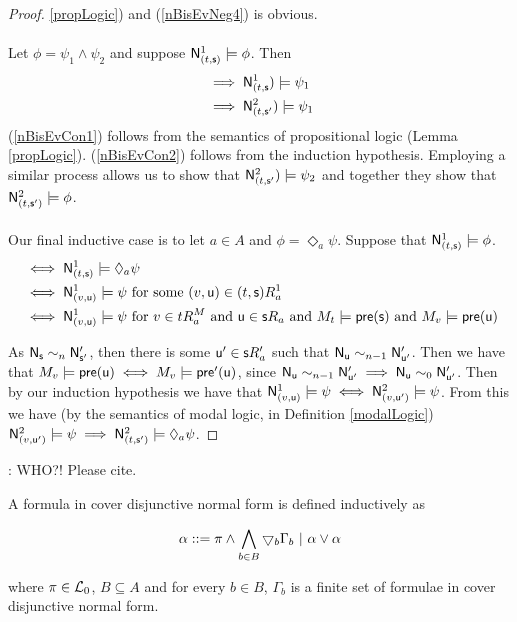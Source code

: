 \begin{proof}
		\ref{propLogic}) and (\ref{nBisEvNeg4}) is obvious.\\
\\
Let $\phi = \psi_1 \land \psi_2$ and suppose $\mathrm{\mathsf{N}}^1_{(t,\mathrm{\mathsf{s}})} \models \phi$.
Then
\begin{align}
	& \implies \mathrm{\mathsf{N}}^1_{(t,\mathrm{\mathsf{s}}}) \models \psi_1 \label{nBisEvCon1} \\
	& \implies \mathrm{\mathsf{N}}^2_{(t,\mathrm{\mathsf{s}}'}) \models \psi_1 \label{nBisEvCon2}
\end{align}
(\ref{nBisEvCon1}) follows from the semantics of propositional logic (Lemma \ref{propLogic}).
(\ref{nBisEvCon2}) follows from the induction hypothesis.
Employing a similar process allows us to show that $\mathrm{\mathsf{N}}^2_{(t,\mathrm{\mathsf{s}}'}) \models \psi_2$ and together they 
show that $\mathrm{\mathsf{N}}^2_{(t,\mathrm{\mathsf{s}}')} \models \phi$.\\
\\
Our final inductive case is to let $a \in A$ and $\phi = \Diamond_a \psi$.
Suppose that $\mathrm{\mathsf{N}}^1_{(t,\mathrm{\mathsf{s}})} \models \phi$.
\begin{align}
	& \iff \mathrm{\mathsf{N}}^1_{(t,\mathrm{\mathsf{s}})} \models \Diamond_a \psi \label{nBisEvMod1} \\
	& \iff \mathrm{\mathsf{N}}^1_{(v,\mathrm{\mathsf{u}})} \models \psi \text{ for some $(v,\mathrm{\mathsf{u}}) \in (t,\mathrm{\mathsf{s}}) R^1_a$} \label{nBisEvMod2} \\
	& \iff \mathrm{\mathsf{N}}^1_{(v,\mathrm{\mathsf{u}})} \models \psi \text{ for $v \in t R^M_a$ and $\mathrm{\mathsf{u}} \in \mathrm{\mathsf{s}} R_a$ and $M_t \models
		\mathrm{\mathsf{pre}}(\mathrm{\mathsf{s}})$ and $M_v \models \mathrm{\mathsf{pre}}(\mathrm{\mathsf{u}})$} \label{nBisEvMod3} \\
\end{align}

As $\mathrm{\mathsf{N}}_\mathrm{\mathsf{s}} \sim_n \mathrm{\mathsf{N}}'_{\mathrm{\mathsf{s}}'}$, then there is some $\mathrm{\mathsf{u}}' \in \mathrm{\mathsf{s}} R'_a$ such that $\mathrm{\mathsf{N}}_\mathrm{\mathsf{u}} \sim_{n-1} \mathrm{\mathsf{N}}'_{\mathrm{\mathsf{u}}'}$.
Then we have that $M_v \models \mathrm{\mathsf{pre}}(\mathrm{\mathsf{u}}) \iff M_v \models \mathrm{\mathsf{pre}}'(\mathrm{\mathsf{u}})$, since $\mathrm{\mathsf{N}}_\mathrm{\mathsf{u}} \sim_{n-1} \mathrm{\mathsf{N}}'_{\mathrm{\mathsf{u}}'}
\implies \mathrm{\mathsf{N}}_\mathrm{\mathsf{u}} \sim_0 \mathrm{\mathsf{N}}'_{\mathrm{\mathsf{u}}'}$.
Then by our induction hypothesis we have that $\mathrm{\mathsf{N}}^1_{(v,\mathrm{\mathsf{u}})} \models \psi \iff \mathrm{\mathsf{N}}^2_{(v, \mathrm{\mathsf{u}}')} \models
\psi$.
From this we have (by the semantics of modal logic, in Definition \ref{modalLogic}) $\mathrm{\mathsf{N}}^2_{(v,\mathrm{\mathsf{u}}')}
\models \psi \implies \mathrm{\mathsf{N}}^2_{(t,\mathrm{\mathsf{s}}')} \models \Diamond_a \psi$.
\end{proof}

\FIXME: WHO?! Please cite.

\begin{defn} \label{coverNormal}
A formula in cover disjunctive normal form is defined inductively as

\[
	\alpha ::= \pi \land \bigwedge_{b \in B} \bigtriangledown_b \Gamma_b \text{ } | \text{ } \alpha \lor \alpha
\]

where $\pi \in \mathcal{L}_0$, $B \subseteq A$ and for every $b \in B$, $\Gamma_b$ is a finite set of
formulae in cover disjunctive normal form.
\end{defn}


